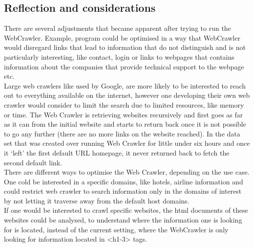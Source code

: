 \subsection{Reflection and considerations}
There are several adjustments that became apparent after trying to run the WebCrawler. Example, program could be optimised in a way that WebCrawler would disregard links that lead to information that do not distinguish and is not particularly interesting, like contact, login or links to webpages that contains information about the companies that provide technical support to the webpage etc.\\
Large web crawlers like used by Google, are more likely to be interested to reach out to everything available on the internet, however one developing their own web crawler would consider to limit the search due to limited resources, like memory or time. The Web Crawler is retrieving websites recursively and first goes as far as it can from the initial website and starts to return back once it is not possible to go any further (there are no more links on the website reached). In the data set that was created over running Web Crawler for little under six hours and once it ‘left’ the first default URL homepage, it never returned back to fetch the second default link.\\
There are different ways to optimise the Web Crawler, depending on the use case. One cold be interested in a specific domains, like hotels, airline information and could restrict web crawler to search information only in the domains of interest by not letting it traverse away from the default host domains.\\
If one would be interested to crawl specific websites, the html documents of these websites could be analysed, to understand where the information one is looking for is located, instead of the current setting, where the WebCrawler is only looking for information located in <h1-3> tags.
